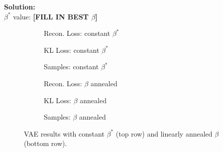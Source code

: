 \documentclass[11pt]{article}
\begin{document}
\textbf{Solution:}\\
$\beta^{*}$ value: \textbf{[FILL IN BEST $\beta$]}

\begin{figure}[H]
  \centering
  \begin{subfigure}[b]{0.3\textwidth}
    \centering
    \fbox{\rule{0pt}{3cm}\rule{0.9\textwidth}{0pt}}
    \caption{Recon. Loss: constant $\beta^*$}
  \end{subfigure}
  \hfill
  \begin{subfigure}[b]{0.3\textwidth}
    \centering
    \fbox{\rule{0pt}{3cm}\rule{0.9\textwidth}{0pt}}
    \caption{KL Loss: constant $\beta^*$}
  \end{subfigure}
  \hfill
  \begin{subfigure}[b]{0.3\textwidth}
    \centering
    \fbox{\rule{0pt}{3cm}\rule{0.9\textwidth}{0pt}}
    \caption{Samples: constant $\beta^*$}
  \end{subfigure}

  \vspace{0.5em}

  \begin{subfigure}[b]{0.3\textwidth}
    \centering
    \fbox{\rule{0pt}{3cm}\rule{0.9\textwidth}{0pt}}
    \caption{Recon. Loss: $\beta$ annealed}
  \end{subfigure}
  \hfill
  \begin{subfigure}[b]{0.3\textwidth}
    \centering
    \fbox{\rule{0pt}{3cm}\rule{0.9\textwidth}{0pt}}
    \caption{KL Loss: $\beta$ annealed}
  \end{subfigure}
  \hfill
  \begin{subfigure}[b]{0.3\textwidth}
    \centering
    \fbox{\rule{0pt}{3cm}\rule{0.9\textwidth}{0pt}}
    \caption{Samples: $\beta$ annealed}
  \end{subfigure}
  \caption{VAE results with constant $\beta^*$ (top row) and linearly annealed $\beta$ (bottom row).}
\end{figure}

\end{document}
